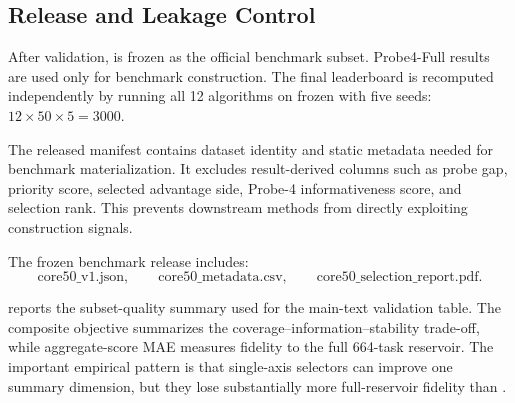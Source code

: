 \subsection{Release and Leakage Control}
\label{app:core50-release-leakage}

After validation, \core{} is frozen as the official benchmark subset. Probe4-Full results are used only for benchmark construction. The final leaderboard is recomputed independently by running all 12 algorithms on frozen \core{} with five seeds:$12\times 50\times 5 = 3000.$

The released \core{} manifest contains dataset identity and static metadata needed for benchmark materialization. It excludes result-derived columns such as probe gap, priority score, selected advantage side, Probe-4 informativeness score, and selection rank. This prevents downstream methods from directly exploiting construction signals.

The frozen benchmark release includes:
\[
\mathrm{core50\_v1.json},
\qquad
\mathrm{core50\_metadata.csv},
\qquad
\mathrm{core50\_selection\_report.pdf}.
\]

 reports the subset-quality summary used for the main-text validation table. The composite objective summarizes the coverage--information--stability trade-off, while aggregate-score MAE measures fidelity to the full 664-task reservoir. The important empirical pattern is that single-axis selectors can improve one summary dimension, but they lose substantially more full-reservoir fidelity than \core{}.


